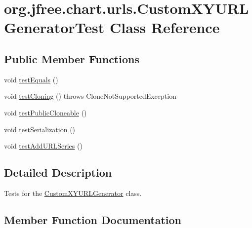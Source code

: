 \hypertarget{classorg_1_1jfree_1_1chart_1_1urls_1_1_custom_x_y_u_r_l_generator_test}{}\section{org.\+jfree.\+chart.\+urls.\+Custom\+X\+Y\+U\+R\+L\+Generator\+Test Class Reference}
\label{classorg_1_1jfree_1_1chart_1_1urls_1_1_custom_x_y_u_r_l_generator_test}
\subsection*{Public Member Functions}
\begin{DoxyCompactItemize}
\item 
void \mbox{\hyperlink{classorg_1_1jfree_1_1chart_1_1urls_1_1_custom_x_y_u_r_l_generator_test_af02bc2be663a2dc5809519ae7d5b37b1}{test\+Equals}} ()
\item 
void \mbox{\hyperlink{classorg_1_1jfree_1_1chart_1_1urls_1_1_custom_x_y_u_r_l_generator_test_ab0341c432ad1d9a36c054c6da17f364d}{test\+Cloning}} ()  throws Clone\+Not\+Supported\+Exception 
\item 
void \mbox{\hyperlink{classorg_1_1jfree_1_1chart_1_1urls_1_1_custom_x_y_u_r_l_generator_test_abb71096c1a31cca9fde9e6cfaa71224c}{test\+Public\+Cloneable}} ()
\item 
void \mbox{\hyperlink{classorg_1_1jfree_1_1chart_1_1urls_1_1_custom_x_y_u_r_l_generator_test_a261684647d9c7e268425b9cedc213813}{test\+Serialization}} ()
\item 
void \mbox{\hyperlink{classorg_1_1jfree_1_1chart_1_1urls_1_1_custom_x_y_u_r_l_generator_test_a83805aa61a86dbe4d9e2f4116e7eff9d}{test\+Add\+U\+R\+L\+Series}} ()
\end{DoxyCompactItemize}


\subsection{Detailed Description}
Tests for the \mbox{\hyperlink{classorg_1_1jfree_1_1chart_1_1urls_1_1_custom_x_y_u_r_l_generator}{Custom\+X\+Y\+U\+R\+L\+Generator}} class. 

\subsection{Member Function Documentation}
\mbox{\label{classorg_1_1jfree_1_1chart_1_1urls_1_1_custom_x_y_u_r_l_generator_test_a83805aa61a86dbe4d9e2f4116e7eff9d}} 
